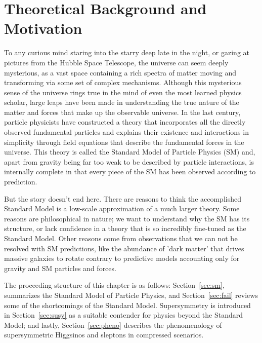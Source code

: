 \chapter{Theoretical Background and Motivation}
\label{ch:thy}
To any curious mind staring into the starry deep late in the night, or gazing at pictures from the Hubble Space Telescope, the universe can seem deeply mysterious, as a vast space containing a rich spectra of matter moving and transforming via some set of complex mechanisms.  Although this mysterious sense of the universe rings true in the mind of even the most learned physics scholar, large leaps have been made in understanding the true nature of the matter and forces that make up the observable universe.   In the last century, particle physicists have constructed a theory that incorporates all the directly observed fundamental particles and explains their existence and interactions in simplicity through field equations that describe the fundamental forces in the universe.  This theory is called the Standard Model of Particle Physics (SM) and, apart from gravity being far too weak to be described by particle interactions, is internally complete in that every piece of the SM has been observed according to prediction.

But the story doesn't end here.  There are reasons to think the accomplished Standard Model is a low-scale approximation of a much larger theory.  Some reasons are philosophical in nature; we want to understand why the SM has its structure, or lack confidence in a theory that is so incredibly fine-tuned as the Standard Model.  Other reasons come from observations that we can not be resolved with SM predictions, like the  abundance of 'dark matter' that drives massive galaxies to rotate contrary to predictive models accounting only for gravity and SM particles and forces.

The proceeding structure of this chapter is as follows: Section~\ref{sec:sm}, summarizes the Standard Model of Particle Physics, and Section~\ref{sec:fail} reviews some of the shortcomings of the Standard Model.  Supersymmetry is introduced in Section~\ref{sec:susy} as a suitable contender for physics beyond the Standard Model; and lastly, Section~\ref{sec:pheno} describes the phenomenology of supersymmetric Higgsinos and sleptons in compressed scenarios.

